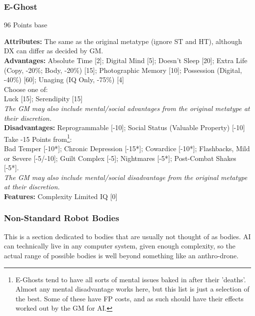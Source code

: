 \begin{multicols*}{3}
	\subsubsection*{E-Ghost}
	\begin{flushright}
		96 Points base
	\end{flushright}
	\textbf{Attributes:} 
	The same as the original metatype (ignore ST and HT), although DX can differ as decided by GM.
	\\\textbf{Advantages:} 
	Absolute Time [2]; Digital Mind [5]; Doesn't Sleep [20]; Extra Life (Copy, -20\%; Body, -20\%) [15]; Photographic Memory [10]; Possession (Digital, -40\%) [60]; Unaging (IQ Only, -75\%) [4]
	\\
	Choose one of: \\
	Luck [15]; Serendipity [15]
	\\
	\textit{The GM may also include mental/social advantages from the original metatype at their discretion.}
	\\\textbf{Disadvantages:} 
	Reprogrammable [-10]; Social Status (Valuable Property) [-10]
	\\
	Take -15 Points from\footnote{E-Ghosts tend to have all sorts of mental issues baked in after their 'deaths'. Almost any mental disadvantage works here, but this list is just a selection of the best. Some of these have FP costs, and as such should have their effects worked out by the GM for AI.}:\\
	Bad Temper [-10*]; Chronic Depression [-15*]; Cowardice [-10*]; Flashbacks, Mild or Severe [-5/-10];  Guilt Complex [-5]; Nightmares [-5*]; Post-Combat Shakes [-5*].
	\\
	\textit{The GM may also include mental/social disadvantage from the original metatype at their discretion.}
	\\\textbf{Features:}
	Complexity Limited IQ [0]
	
	\subsubsection{Non-Standard Robot Bodies}
	
	This is a section dedicated to bodies that are usually not thought of as bodies. AI can technically live in any computer system, given enough complexity, so the actual range of possible bodies is well beyond something like an anthro-drone.
	

\end{multicols*}
